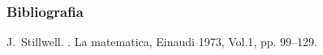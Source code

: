 \begin{frame}
    \frametitle{Bibliografia}
    \begin{thebibliography}
        J.~Stillwell.
        .
        \newblock La matematica, Einaudi 1973, Vol.1, pp. 99--129.
    \end{thebibliography}
\end{frame}